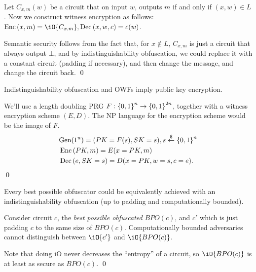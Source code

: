 Let $C_{x,m}(w)$ be a circuit that on input $w$, outputs $m$ if and only if $(x,w) \in L$.
Now we construct witness encryption as follows:
$\ENC{x,m}=\iO{C_{x,m}}, \DEC{x,w,c}=c(w)$.

Semantic security follows from the fact that, for $x\not\in L$, $C_{x,m}$ is just a circuit that always output $\bot$, and by indistinguishability obfuscation, we could replace it with a constant circuit (padding if necessary), and then change the message, and change the circuit back.
\qed


\begin{lemma}
	Indistinguishability obfuscation and OWFs imply public key encryption.
\end{lemma}
\proof
We'll use a length doubling PRG $F: \left\{0,1\right\}^n \to \left\{0,1\right\}^{2n}$, together with a witness encryption scheme $(E,D)$.
The NP language for the encryption scheme would be the image of $F$.
\begin{align*}
	&\mathrm{Gen}(1^n) = (PK = F(s), SK=s), s\overset{\$}{\leftarrow} \left\{0,1\right\}^n\\
	&\mathop{\mathrm{Enc}}\left(PK,m\right) = E(x=PK,m)\\
	&\mathop{\mathrm{Dec}}\left(e,SK=s\right) = D(x=PK,w=s,c=e).
\end{align*}
\qed

\begin{lemma}
	Every best possible obfuscator could be equivalently achieved with an indistinguishability obfuscation (up to padding and computationally bounded).
\end{lemma}

\proof
Consider circuit $c$, the \emph{best possible obfuscated} $BPO(c)$, and $c'$ which is just padding $c$ to the same size of $BPO(c)$.
Computationally bounded adversaries cannot distinguish between $\iO{c'}$ and $\iO{BPO(c)}$.

Note that doing iO never decreases the ``entropy'' of a circuit, so $\iO{BPO(c)}$ is at least as secure as $BPO(c)$.
\qed







